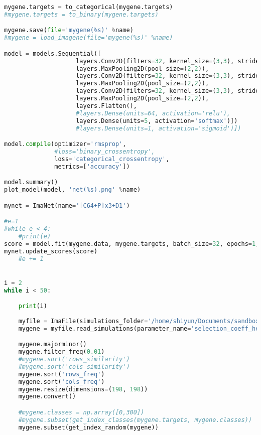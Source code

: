 \begin{lstlisting}[language=Python,breaklines]
mygene.targets = to_categorical(mygene.targets)
#mygene.targets = to_binary(mygene.targets)

mygene.save(file='mygene(%s)' %name)
#mygene = load_imagene(file='mygene(%s)' %name)

model = models.Sequential([
                    layers.Conv2D(filters=32, kernel_size=(3,3), strides=(1,1), activation='relu', kernel_regularizer=regularizers.l1_l2(l1=0.005, l2=0.005), padding='valid', input_shape=mygene.data.shape[1:4]),
                    layers.MaxPooling2D(pool_size=(2,2)),
                    layers.Conv2D(filters=32, kernel_size=(3,3), strides=(1,1), activation='relu', kernel_regularizer=regularizers.l1_l2(l1=0.005, l2=0.005), padding='valid'),
                    layers.MaxPooling2D(pool_size=(2,2)),
                    layers.Conv2D(filters=32, kernel_size=(3,3), strides=(1,1), activation='relu', kernel_regularizer=regularizers.l1_l2(l1=0.005, l2=0.005), padding='valid'),
                    layers.MaxPooling2D(pool_size=(2,2)),
                    layers.Flatten(),
                    #layers.Dense(units=64, activation='relu'),
                    layers.Dense(units=5, activation='softmax')])
                    #layers.Dense(units=1, activation='sigmoid')])

model.compile(optimizer='rmsprop',
              #loss='binary_crossentropy',
              loss='categorical_crossentropy',
              metrics=['accuracy'])

model.summary()
plot_model(model, 'net(%s).png' %name)

mynet = ImaNet(name='[C64+P]x3+D1')

#e=1
#while e < 4:
    #print(e)
score = model.fit(mygene.data, mygene.targets, batch_size=32, epochs=1, verbose=1, validation_split=0.10)
mynet.update_scores(score)
    #e += 1


i = 2
while i < 50:

    print(i)
    
    myfile = ImaFile(simulations_folder='/home/shiyun/Documents/sandbox/Binary3/Simulations' + str(i) + '.Epoch3', nr_samples=198, model_name='3epoch-CEU')
    mygene = myfile.read_simulations(parameter_name='selection_coeff_hetero', max_nrepl=2000)

    mygene.majorminor()
    mygene.filter_freq(0.01)
    #mygene.sort('rows_similarity')
    #mygene.sort('cols_similarity')
    mygene.sort('rows_freq')
    mygene.sort('cols_freq')
    mygene.resize(dimensions=(198, 198))
    mygene.convert()

    #mygene.classes = np.array([0,300])
    #mygene.subset(get_index_classes(mygene.targets, mygene.classes))
    mygene.subset(get_index_random(mygene))


\end{lstlisting}
